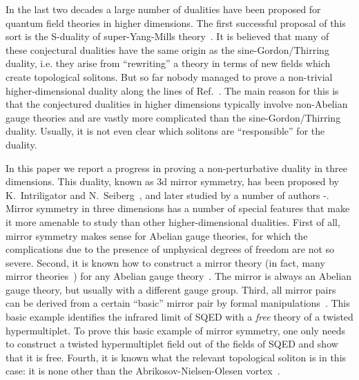 \documentclass[a4paper,12pt, amsfonts, amssymb]{article}
\begin{document}
In the last two decades a large number of dualities have been proposed for
quantum field theories in higher dimensions. The first successful
proposal of this sort is the S-duality of \coordHE{}  \coordHE{} super-Yang-Mills
theory~\cite{MO,WO,Osborn}. It is believed that many of these conjectural dualities have the same origin as the sine-Gordon/Thirring duality,
i.e. they arise from ``rewriting'' a theory in terms of new fields
which create topological solitons. But so far nobody managed to
prove a non-trivial higher-dimensional duality along the lines of
Ref.~\cite{Mandelstam}. The main reason for this is that the conjectured
dualities in higher dimensions typically involve non-Abelian
gauge theories and are vastly more complicated than the sine-Gordon/Thirring duality. Usually, it is not even clear which solitons
are ``responsible'' for the duality.

In this paper we report a progress in proving a non-perturbative duality
in three dimensions. This duality, known as 3d mirror symmetry,
has been proposed by K.~Intriligator and N.~Seiberg~\cite{IS}, and
later studied by a number of authors \cite{deBHOO}-\cite{GT}.
Mirror symmetry in three dimensions has a number of special features
that make it more amenable to study than other higher-dimensional
dualities. First of all, mirror symmetry makes sense for Abelian gauge
theories, for which the complications due to the presence of unphysical 
degrees of freedom are not so severe. Second, it is known how to
construct a mirror theory (in fact, many mirror theories~\cite{KS})
for any Abelian gauge theory~\cite{deBHOOY,KS}. The mirror is always an 
Abelian gauge theory, but usually with a different gauge group.
Third, all mirror pairs can be derived from
a certain ``basic'' mirror pair by formal manipulations~\cite{KS}.
This basic example identifies the infrared limit of \coordHE{}  \coordHE{}  \coordHE{} 
SQED with a {\it free} theory of a twisted hypermultiplet. To prove
this basic example of mirror symmetry, one only needs to construct a 
twisted hypermultiplet field out of the fields of \coordHE{} SQED and show 
that it is free. Fourth, it is known what the relevant topological soliton 
is in this case: it is none other than the Abrikosov-Nielsen-Olesen 
vortex~\cite{five}.
\end{document}
